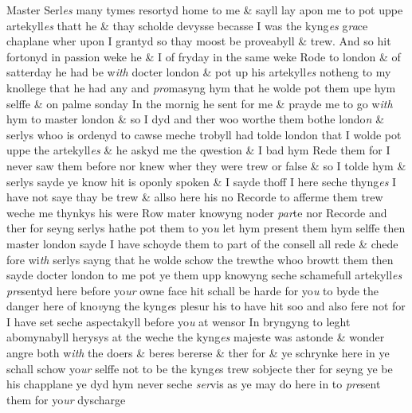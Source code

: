 \documentclass[12pt, a4paper]{book}
\begin{document}
            			
				\marginpar[\vspace{0.5cm}{\textcolor{Gray}{Salisbery}}]{}
			
            			
		\ifthenelse{\isodd{\thepage}}
		{\reversemarginpar}
		{\normalmarginpar}
		Master Serl\textit{es} many tymes resortyd home to me \& sayll lay apon me to pot
  uppe artekyll\textit{es} thatt he \& thay scholde devysse becasse I was the kyng\textit{es} g\textit{ra}ce
  chaplane wher upon I grantyd so thay moost be proveabyll \& trew. And so hit
            				fortonyd in passion weke he \& I of fryday in the same weke Rode to london
 \& of satterday he had be w\textit{ith} docter london \& pot up his artekyll\textit{es} notheng to
 my knollege that he had any and \textit{pro}masyng hym that he wolde pot them upe
 hym selffe \& on palme sonday In the mornig he sent for me \& prayde me to
 go w\textit{ith} hym to master london \& so I dyd and ther woo worthe them bothe londo\textit{n}
            				\& serlys whoo is ordenyd to cawse meche trobyll had tolde london that I
 wolde pot uppe the artekyll\textit{es} \& he askyd me the qwestion \& I bad hym Rede them
 for I never saw them before nor knew wher they were trew or false \& so I tolde
 hym \& serlys sayde ye know hit is oponly spoken \& I sayde thoff I here seche
 thyng\textit{es} I have not saye thay be trew \& allso here his no Recorde to afferme
 them trew weche me thynkys his were Row mater knowyng noder \textit{par}te
            				nor Recorde and ther for seyng serlys hathe pot them to yo\textit{u} let hym
            				present them hym selffe then master london sayde I have schoyde them to part
            				of the consell all rede \& chede fore wi\textit{th} serlys sayng that he wolde schow the
            				trewthe whoo browtt them then sayde docter london to me pot ye them
 upp knowyng seche schamefull artekyll\textit{es}
               \textit{pre}sentyd here before yo\textit{ur} owne face
 hit schall be harde for yo\textit{u} to byde the danger here of kno\textit{v}yng the kyng\textit{e}s
 plesur his to have hit soo and also fere not for I have set seche aspectakyll
 before yo\textit{u} at wensor In bryngyng to leght abomynabyll herysys at the
 weche the kyng\textit{es} majeste was astonde \& wonder angre both w\textit{ith} the doers \&
 beres bererse \& ther for \& ye schrynke here in ye schall schow yo\textit{ur} selffe not
 to be the kyng\textit{e}s trew sobjecte ther for seyng ye be his chapplane ye dyd
 hym never seche \textit{ser}vis as ye may do here in to \textit{pre}sent them for yo\textit{ur }dyscharge
\end{document}
